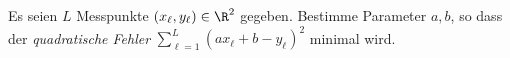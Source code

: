 \begin{prob}
Es seien $L$ Messpunkte $(x_\ell,y_\ell)\in\R^2$ gegeben. Bestimme Parameter $a,b$, so dass der \emph{quadratische Fehler} $\sum_{\ell=1}^L(ax_\ell+b-y_\ell)^2$ minimal wird.
\end{prob}
